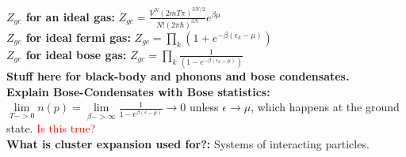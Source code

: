 \documentclass[12pt]{extarticle}
\begin{document}
\textbf{$Z_{gc}$ for an ideal gas:} $Z_{gc} = \frac{V^N(2mT\pi)^{3N/2}}{N!(2\pi\hbar)^{3N}} e^{\beta\mu}$ \\
\textbf{$Z_{gc}$ for ideal fermi gas:} $Z_{gc} = \prod\limits_k \left(1+e^{-\beta(\epsilon_k-\mu)}\right)$ \\
\textbf{$Z_{gc}$ for ideal bose gas:} $Z_{gc} = \prod\limits_k \frac{1}{\left(1-e^{-\beta(\epsilon_k-\mu)}\right)}$ \\
\textbf{Stuff here for black-body and phonons and bose condensates.} \\
\textbf{Explain Bose-Condensates with Bose statistics:} $\lim\limits_{T->0}n(p) = \lim\limits_{\beta->\infty} \frac{1}{1-e^{\beta(\epsilon-\mu)}} \rightarrow 0$ unless $\epsilon \rightarrow \mu$, which happens at the ground state. \textcolor{red}{Is this true?} \\
\textbf{What is cluster expansion used for?:} Systems of interacting particles. \\
\end{document}
